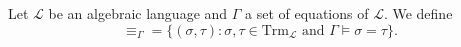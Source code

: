 Let $\mathcal{L}$ be an algebraic language and $\Gamma$ a set of equations of $\mathcal{L}$. We define
$$\equiv_\Gamma = \{(\sigma, \tau) : \sigma, \tau \in \mathrm{Trm}_\mathcal{L} \text{ and } \Gamma \models \sigma = \tau\}.$$
